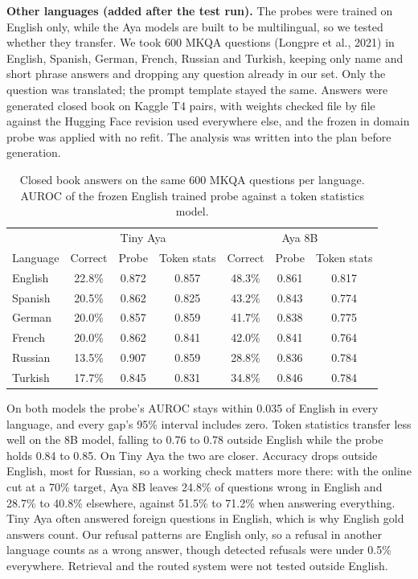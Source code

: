 \documentclass[11pt,a4paper]{article}
\begin{document}
\textbf{Other languages (added after the test run).} The probes were trained on English only, while the Aya models are built to be multilingual, so we tested whether they transfer. We took 600 MKQA questions (Longpre et al., 2021) in English, Spanish, German, French, Russian and Turkish, keeping only name and short phrase answers and dropping any question already in our set. Only the question was translated; the prompt template stayed the same. Answers were generated closed book on Kaggle T4 pairs, with weights checked file by file against the Hugging Face revision used everywhere else, and the frozen in domain probe was applied with no refit. The analysis was written into the plan before generation.

\begin{table}[h]
\centering\small
\caption{Closed book answers on the same 600 MKQA questions per language. AUROC of the frozen English trained probe against a token statistics model.}
\label{tab:lang}
\begin{tabular}{lcccccc}
\toprule
 & \multicolumn{3}{c}{Tiny Aya} & \multicolumn{3}{c}{Aya 8B}\\
Language & Correct & Probe & Token stats & Correct & Probe & Token stats\\
\midrule
English & 22.8\% & 0.872 & 0.857 & 48.3\% & 0.861 & 0.817\\
Spanish & 20.5\% & 0.862 & 0.825 & 43.2\% & 0.843 & 0.774\\
German & 20.0\% & 0.857 & 0.859 & 41.7\% & 0.838 & 0.775\\
French & 20.0\% & 0.862 & 0.841 & 42.0\% & 0.841 & 0.764\\
Russian & 13.5\% & 0.907 & 0.859 & 28.8\% & 0.836 & 0.784\\
Turkish & 17.7\% & 0.845 & 0.831 & 34.8\% & 0.846 & 0.784\\
\bottomrule
\end{tabular}
\end{table}

On both models the probe's AUROC stays within 0.035 of English in every language, and every gap's 95\% interval includes zero. Token statistics transfer less well on the 8B model, falling to 0.76 to 0.78 outside English while the probe holds 0.84 to 0.85. On Tiny Aya the two are closer. Accuracy drops outside English, most for Russian, so a working check matters more there: with the online cut at a 70\% target, Aya 8B leaves 24.8\% of questions wrong in English and 28.7\% to 40.8\% elsewhere, against 51.5\% to 71.2\% when answering everything. Tiny Aya often answered foreign questions in English, which is why English gold answers count. Our refusal patterns are English only, so a refusal in another language counts as a wrong answer, though detected refusals were under 0.5\% everywhere. Retrieval and the routed system were not tested outside English.
\end{document}
